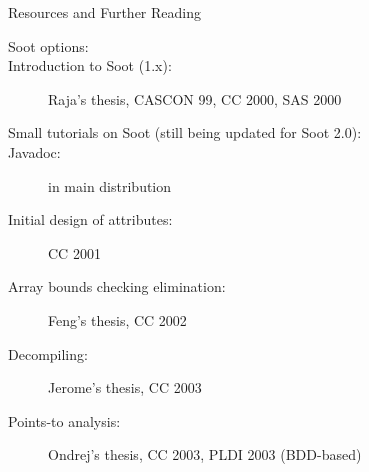 \begin{slide}{Resources and Further Reading}
\begin{description}
\item [Soot options:]
\item [Introduction to Soot (1.x):]  
Raja's thesis, CASCON 99, CC 2000, SAS 2000
\item [Small tutorials on Soot (still being updated for Soot 2.0):]
\item [Javadoc:] in main distribution
\item [Initial design of attributes:] CC 2001
\item [Array bounds checking elimination:] Feng's thesis, CC 2002
\item [Decompiling:] Jerome's thesis, CC 2003
\item [Points-to analysis:] Ondrej's thesis, CC 2003, PLDI 2003 (BDD-based)
\end{description}
\end{slide}
